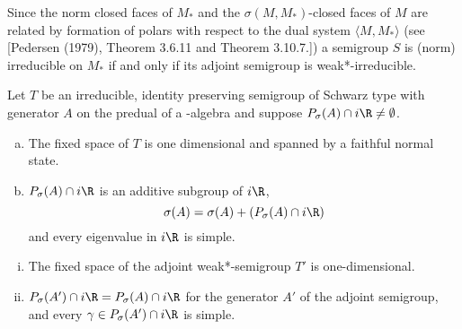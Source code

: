Since the norm closed faces of $M_{*}$ and the $\sigma(M,M_{*})$-closed faces of $M$ are related by formation of polars with respect to the dual system $\langle M,M_{*} \rangle$ (see [Pedersen (1979), Theorem 3.6.11 and Theorem 3.10.7.]) a semigroup $S$ is (norm) irreducible on $M_{*}$ if and only if its adjoint semigroup is weak*-irreducible.

\begin{theorem}\label{thm:d3-1.10}
Let $T$ be an irreducible, identity preserving semigroup of Schwarz type with generator $A$ on the predual of a \WA-algebra and suppose $P_{\sigma}(A) \cap i\R \neq \emptyset$.

\begin{enumerate}[(a)]
\item The fixed space of $T$ is one dimensional and spanned by a faithful normal state.

\item $P_{\sigma}(A) \cap i\R$ is an additive subgroup of $i\R$,
\[
\sigma(A) = \sigma(A) + (P_{\sigma}(A) \cap i\R)
\]
and every eigenvalue in $i\R$ is simple.
\end{enumerate}

\begin{enumerate}[(i)]
\item The fixed space of the adjoint weak*-semigroup $T'$ is one-dimensional.

\item $P_{\sigma}(A') \cap i\R = P_{\sigma}(A) \cap i\R$ for the generator $A'$ of the adjoint semigroup, and every $\gamma \in P_{\sigma}(A') \cap i\R$ is simple.
\end{enumerate}
\end{theorem}


